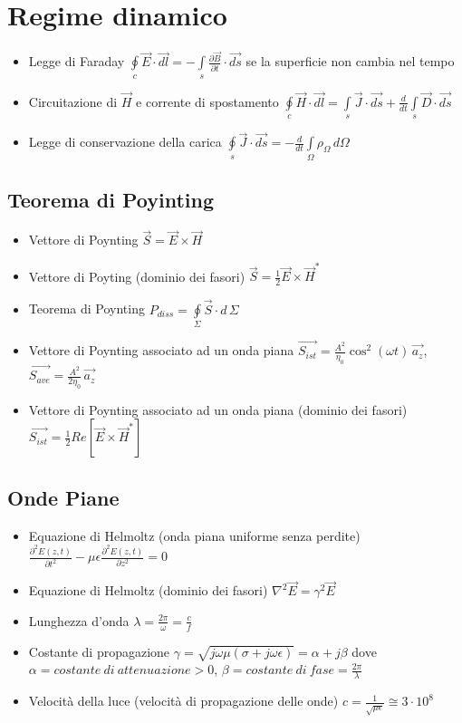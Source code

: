\documentclass{article}
\begin{document}
\section{Regime dinamico}
\begin{itemize}
	\item Legge di Faraday \(\oint\limits_c \vec{E} \cdot \vec{dl} = - \int\limits_s \frac{\partial \vec{B}}{\partial t} \cdot \vec{ds} \) se la superficie non cambia nel tempo
	\item Circuitazione di \( \vec{H} \) e corrente di spostamento \( \oint\limits_c \vec{H} \cdot \vec{dl} = \int\limits_s \vec{J} \cdot \vec{ds} + \frac{d}{dt} \int\limits_s \vec{D} \cdot \vec{ds} \)
	\item Legge di conservazione della carica \( \oint\limits_s \vec{J} \cdot \vec{ds} = -\frac{d}{dt} \int\limits_\Omega \rho_\Omega \, d\Omega \)
	\end{itemize}
	
\subsection{Teorema di Poyinting}
\begin{itemize}
	\item Vettore di Poynting \( \vec{S} = \vec{E} \times \vec{H} \)
	\item Vettore di Poyting (dominio dei fasori) \( \vec{S} = \frac{1}{2} \vec{E} \times \vec{H}^{*} \)
	\item Teorema di Poynting \( P_{diss} = \oint\limits_\Sigma \vec{S} \cdot d \,\Sigma \)
	\item Vettore di Poynting associato ad un onda piana \( \vec{S_{ist}} = \frac{A^2}{\eta_0} \cos^2{(\omega t)} \, \vec{a_z} \), \( \vec{S_{ave}} = \frac{A^2}{2 \eta_0} \, \vec{a_z}\)
	\item Vettore di Poynting associato ad un onda piana (dominio dei fasori) \( \vec{S_{ist}} = \frac{1}{2} Re[\vec{E} \times \vec{H}^{*}] \)
\end{itemize}

\subsection{Onde Piane}
\begin{itemize}
	\item Equazione di Helmoltz (onda piana uniforme senza perdite) \( \frac{\partial^2 E(z, t)}{\partial t^2} - \mu \epsilon \frac{\partial^2 E(z, t)}{\partial z^2} = 0\)
	\item Equazione di Helmoltz (dominio dei fasori) \( \nabla^2 \vec{E} = \gamma^2 \vec{E} \)
	\item Lunghezza d'onda \( \lambda = \frac{2 \pi}{\omega} = \frac{c}{f} \)	
	\item Costante di propagazione \( \gamma = \sqrt{j\omega\mu (\sigma + j \omega \epsilon) } = \alpha + j \beta \) dove \( \alpha = costante\ di\ attenuazione > 0\), \( \beta = costante\ di\ fase = \frac{2 \pi}{\lambda} \)
	\item Velocità della luce (velocità di propagazione delle onde) \( c = \frac{1}{\sqrt{\mu \epsilon}} \cong 3 \cdot 10^8 \)
\end{itemize}
\end{document}

